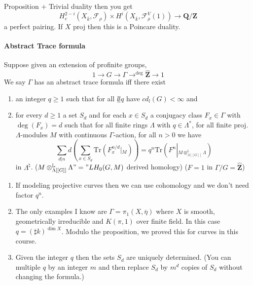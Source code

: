 \begin{remark} Proposition $+$ Trivial duality then you get
	$$H^{2-i}_c(X_{\overline k}, \mathcal{F}_\rho)\times H^i(X_{\overline k}, \mathcal{F}_\rho^V(1))\to \mathbf{Q}/\mathbf{Z}$$
	a perfect pairing. If $X$ proj then this is a Poincare duality. 
\end{remark}

\paragraph{Abstract Trace formula} Suppose given an extension of profinite groups, 
$$
1 \to G \to \Gamma \to^{\deg} \widehat{\mathbf{Z}} \to 1
$$
We say $\Gamma$ has an abstract trace formula iff there exist
	\begin{enumerate}
	\item an integer $q\geq 1$ such that for all $l \not | q$ have $cd_l(G)<\infty$ and
	\item for every $d\geq 1$ a set $S_d$ and for each $x\in S_d$ a conjugacy class $F_x \in \Gamma$ with $\deg(F_x)=d$ such that for all finite rings $\Lambda$ with $q\in \Lambda^*$, for all finite proj. $\Lambda$-modules $M$ with continuous $\Gamma$-action, for all $n>0$ we have
		$$\sum_{d|n}d\left(\sum_{x\in S_d}\text{Tr}(F_x^{n/d}\left|_M\right.)\right) = q^n\text{Tr}(F^n\left|_{M\otimes_{\Lambda[[G]]}^{\mathbb L}\Lambda}\right.)$$
		in $\Lambda^\natural$.  ($M\otimes_{\Lambda[[G]]}^{\mathbb L}\Lambda"=" LH_0(G, M)$ derived homology)
	($F=1$ in $\Gamma/G=\widehat{\mathbf{Z}}$)
	\end{enumerate}	
	
\begin{remark}
	\begin{enumerate}
	\item If modeling projective curves then we can use cohomology and we don't need factor $q^n$. 
	\item The only examples I know are $\Gamma=\pi_1(X, \overline \eta)$ where $X$ is smooth, geometrically irreducible and $K(\pi, 1)$ over finite field. In this case $q=(\sharp k)^{\dim X}$. Modulo the proposition, we proved this for curves in this course.
	\item Given the integer $q$ then the sets $S_d$ are uniquely determined. (You can multiple $q$ by an integer $m$ and then replace $S_d$ by $m^d$ copies of $S_d$ without changing the formula.) 
	\end{enumerate}
\end{remark}
	
